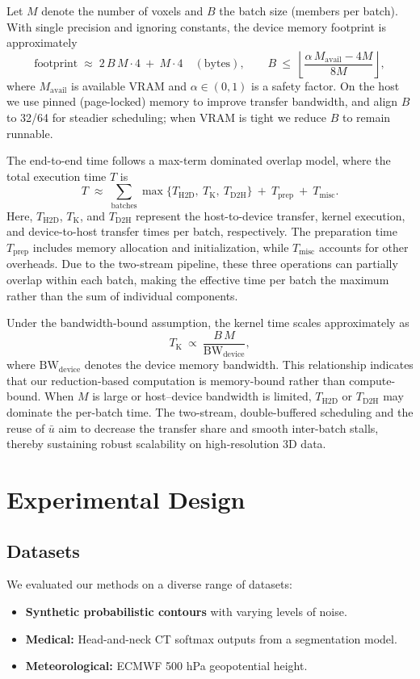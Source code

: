 \documentclass[review,journal]{vgtc}              %
\begin{document}
Let \(M\) denote the number of voxels and \(B\) the batch size (members per batch). With single precision and ignoring constants, the device memory footprint is approximately
\[
 \text{footprint} \;\approx\; 2\,B\,M\cdot 4\ +\ M\cdot 4\quad(\text{bytes}),
 \qquad
 B\ \le\ \left\lfloor \frac{\alpha\,M_{\mathrm{avail}}-4M}{8M} \right\rfloor,
\]
where \(M_{\mathrm{avail}}\) is available VRAM and \(\alpha\in(0,1)\) is a safety factor. On the host we use pinned (page-locked) memory to improve transfer bandwidth, and align \(B\) to 32/64 for steadier scheduling; when VRAM is tight we reduce \(B\) to remain runnable.

The end-to-end time follows a max-term dominated overlap model, where the total execution time \(T\) is
\[
 T \;\approx\; \sum_{\text{batches}} \max\!\bigl\{ T_{\mathrm{H2D}},\ T_{\mathrm{K}},\ T_{\mathrm{D2H}} \bigr\} \ +\ T_{\mathrm{prep}} \ +\ T_{\mathrm{misc}}.
\]
Here, \(T_{\mathrm{H2D}}\), \(T_{\mathrm{K}}\), and \(T_{\mathrm{D2H}}\) represent the host-to-device transfer, kernel execution, and device-to-host transfer times per batch, respectively. The preparation time \(T_{\mathrm{prep}}\) includes memory allocation and initialization, while \(T_{\mathrm{misc}}\) accounts for other overheads. Due to the two-stream pipeline, these three operations can partially overlap within each batch, making the effective time per batch the maximum rather than the sum of individual components.

Under the bandwidth-bound assumption, the kernel time scales approximately as
\[
 T_{\mathrm{K}}\ \propto\ \frac{B\,M}{\mathrm{BW}_{\mathrm{device}}},
\]
where \(\mathrm{BW}_{\mathrm{device}}\) denotes the device memory bandwidth. This relationship indicates that our reduction-based computation is memory-bound rather than compute-bound. When \(M\) is large or host–device bandwidth is limited, \(T_{\mathrm{H2D}}\) or \(T_{\mathrm{D2H}}\) may dominate the per-batch time. The two-stream, double-buffered scheduling and the reuse of \(\bar u\) aim to decrease the transfer share and smooth inter-batch stalls, thereby sustaining robust scalability on high-resolution 3D data.

\section{Experimental Design}
\subsection{Datasets}
We evaluated our methods on a diverse range of datasets:
\begin{itemize}
    \item \textbf{Synthetic probabilistic contours} with varying levels of noise.
    \item \textbf{Medical:} Head-and-neck CT softmax outputs from a segmentation model.
    \item \textbf{Meteorological:} ECMWF 500 hPa geopotential height.

\end{itemize}
\end{document}
